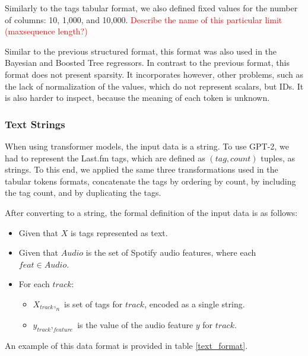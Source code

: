 \documentclass[sn-mathphys]{sn-jnl}%
\theoremstyle{thmstyleone}%
\theoremstyle{thmstyletwo}%
\theoremstyle{thmstylethree}%
\begin{document}
Similarly to the tags tabular format, we also defined fixed values for the number of columns: 10, 1,000, and 10,000.
\textcolor{red}{Describe the name of this particular limit (maxsequence length?)}


Similar to the previous structured format, this format was also used in the Bayesian and Boosted Tree regressors.
In contrast to the previous format, this format does not present sparsity.
It incorporates however, other problems, such as the lack of normalization of the values, which do not represent scalars, but IDs.
It is also harder to inspect, because the meaning of each token is unknown.


\subsubsection{Text Strings}

When using transformer models, the input data is a string.
To use GPT-2, we had to represent the Last.fm tags, which are defined as $(tag, count)$ tuples, as strings.
To this end, we applied the same three transformations used in the tabular tokens formats,
concatenate the tags by ordering by count, by including the tag count, and by duplicating the tags.

After converting to a string, the formal definition of the input data is as follows:

\begin{itemize}
      \item Given that $X$ is tags represented as text.
      \item Given that $Audio$ is the set of Spotify audio features, where each $feat \in Audio$.
      \item For each $track$:
      \begin{itemize}
            \item $X_{track},_{n}$ is set of tags for $track$, encoded as a single string.
            \item $y_{track},_{feature}$ is the value of the audio feature $y$ for $track$.
      \end{itemize}
\end{itemize}

An example of this data format is provided in table \ref{text_format}.
\end{document}
